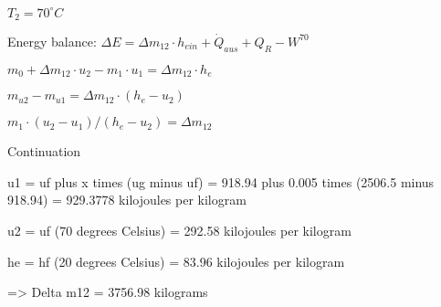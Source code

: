 \( T_2 = 70^\circ C \)  

Energy balance:  
\( \Delta E = \Delta m_{12} \cdot h_{ein} + \dot{Q}_{aus} + Q_R - W^{70} \)  

\( m_0 + \Delta m_{12} \cdot u_2 - m_1 \cdot u_1 = \Delta m_{12} \cdot h_e \)  

\( m_{u2} - m_{u1} = \Delta m_{12} \cdot (h_e - u_2) \)  

\( m_1 \cdot (u_2 - u_1) / (h_e - u_2) = \Delta m_{12} \)

Continuation  

u1 = uf plus x times (ug minus uf)  
= 918.94 plus 0.005 times (2506.5 minus 918.94)  
= 929.3778 kilojoules per kilogram  

u2 = uf (70 degrees Celsius) = 292.58 kilojoules per kilogram  

he = hf (20 degrees Celsius) = 83.96 kilojoules per kilogram  

=> Delta m12 = 3756.98 kilograms